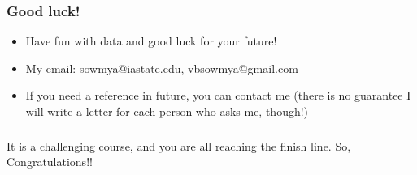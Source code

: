 \documentclass{beamer}
\begin{document}
\begin{frame}
\frametitle{Good luck!}
\begin{itemize}
\item Have fun with data and good luck for your future!
\item My email: sowmya@iastate.edu, vbsowmya@gmail.com 
\item If you need a reference in future, you can contact me (there is no guarantee I will write a letter for each person who asks me, though!)
\end{itemize}
\end{frame}

\begin{frame}
\frametitle{}
\centering
\Large It is a challenging course, and you are all reaching the finish line. So, Congratulations!!
\end{frame}
\end{document}
